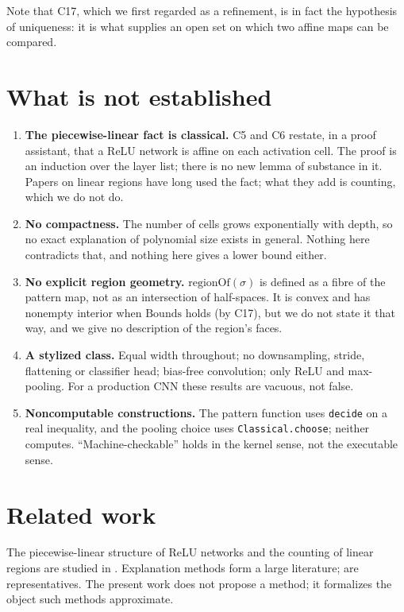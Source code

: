 \documentclass[11pt]{article}
\newcommand{\code}[1]{\texttt{#1}}
\newcommand{\RegOf}{\mathrm{regionOf}}
\begin{document}
Note that C17, which we first regarded as a refinement, is in fact the
hypothesis of uniqueness: it is what supplies an open set on which two affine
maps can be compared.

\section{What is not established}\label{sec:limits}

\begin{enumerate}
\item \textbf{The piecewise-linear fact is classical.} C5 and C6 restate, in a
  proof assistant, that a ReLU network is affine on each activation cell. The
  proof is an induction over the layer list; there is no new lemma of substance
  in it. Papers on linear regions have long used the fact; what they add is
  counting, which we do not do.
\item \textbf{No compactness.} The number of cells grows exponentially with
  depth, so no exact explanation of polynomial size exists in general. Nothing
  here contradicts that, and nothing here gives a lower bound either.
\item \textbf{No explicit region geometry.} $\RegOf(\sigma)$ is defined as a
  fibre of the pattern map, not as an intersection of half-spaces. It is
  convex and has nonempty interior when $\mathrm{Bounds}$ holds (by C17), but
  we do not state it that way, and we give no description of the region's
  faces.
\item \textbf{A stylized class.} Equal width throughout; no downsampling,
  stride, flattening or classifier head; bias-free convolution; only ReLU and
  max-pooling. For a production CNN these results are vacuous, not false.
\item \textbf{Noncomputable constructions.} The pattern function uses
  \code{decide} on a real inequality, and the pooling choice uses
  \code{Classical.choose}; neither computes. ``Machine-checkable'' holds in the
  kernel sense, not the executable sense.
\end{enumerate}

\section{Related work}

The piecewise-linear structure of ReLU networks and the counting of linear
regions are studied in \cite{montufar,telgarsky,arora}. Explanation methods
form a large literature; \cite{lime,shap,gradcam,ig} are representatives. The
present work does not propose a method; it formalizes the object such methods
approximate.
\end{document}
